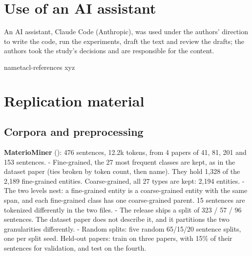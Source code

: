\documentclass[11pt,a4paper]{article}
\begin{document}
\hypertarget{use-of-an-ai-assistant}{%
\section*{Use of an AI assistant}\label{use-of-an-ai-assistant}}

An AI assistant, Claude Code (Anthropic), was used under the authors'
direction to write the code, run the experiments, draft the text and
review the drafts; the authors took the study's decisions and are
responsible for the content.

\pdfdest name{tacl-references} xyz\relax
\nocite{anonymous2026companion}


\appendix

\hypertarget{replication-material}{%
\section{Replication material}\label{replication-material}}

\hypertarget{corpora-and-preprocessing}{%
\subsection{Corpora and preprocessing}\label{corpora-and-preprocessing}}

\textbf{MaterioMiner} (\citealp{durmaz2024materiominer}): 476 sentences, 12.2k tokens,
from 4 papers of 41, 81, 201 and 153 sentences.
- Fine-grained, the 27 most frequent classes are kept, as in the dataset
paper (ties broken by token count, then name). They hold 1,328 of the
2,189 fine-grained entities. Coarse-grained, all 27 types are kept:
2,194 entities.
- The two levels nest: a fine-grained entity is a coarse-grained entity
with the same span, and each fine-grained class has one coarse-grained
parent. 15 sentences are tokenized differently in the two files.
- The release ships a split of 323 / 57 / 96 sentences. The dataset paper
does not describe it, and it partitions the two granularities
differently.
- Random splits: five random 65/15/20 sentence splits, one per split seed.
Held-out papers: train on three papers, with 15\% of their sentences for
validation, and test on the fourth.
\end{document}
